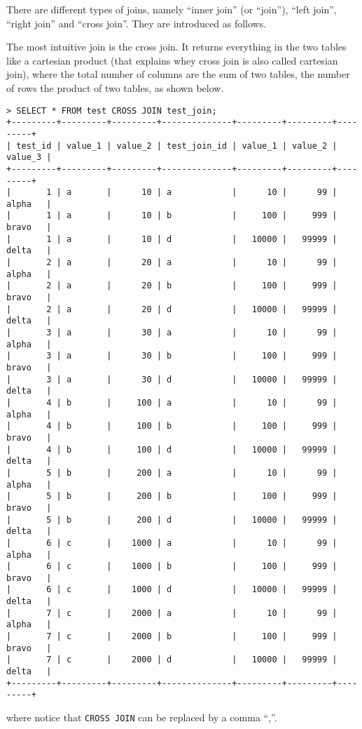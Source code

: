 There are different types of joins, namely ``inner join'' (or ``join''), ``left join'', ``right join'' and ``cross join''. They are introduced as follows.

The most intuitive join is the cross join. It returns everything in the two tables like a cartesian product (that explains whey cross join is also called cartesian join), where the total number of columns are the sum of two tables, the number of rows the product of two tables, as shown below.
\begin{lstlisting}
> SELECT * FROM test CROSS JOIN test_join;
+---------+---------+---------+--------------+---------+---------+---------+
| test_id | value_1 | value_2 | test_join_id | value_1 | value_2 | value_3 |
+---------+---------+---------+--------------+---------+---------+---------+
|       1 | a       |      10 | a            |      10 |      99 | alpha   |
|       1 | a       |      10 | b            |     100 |     999 | bravo   |
|       1 | a       |      10 | d            |   10000 |   99999 | delta   |
|       2 | a       |      20 | a            |      10 |      99 | alpha   |
|       2 | a       |      20 | b            |     100 |     999 | bravo   |
|       2 | a       |      20 | d            |   10000 |   99999 | delta   |
|       3 | a       |      30 | a            |      10 |      99 | alpha   |
|       3 | a       |      30 | b            |     100 |     999 | bravo   |
|       3 | a       |      30 | d            |   10000 |   99999 | delta   |
|       4 | b       |     100 | a            |      10 |      99 | alpha   |
|       4 | b       |     100 | b            |     100 |     999 | bravo   |
|       4 | b       |     100 | d            |   10000 |   99999 | delta   |
|       5 | b       |     200 | a            |      10 |      99 | alpha   |
|       5 | b       |     200 | b            |     100 |     999 | bravo   |
|       5 | b       |     200 | d            |   10000 |   99999 | delta   |
|       6 | c       |    1000 | a            |      10 |      99 | alpha   |
|       6 | c       |    1000 | b            |     100 |     999 | bravo   |
|       6 | c       |    1000 | d            |   10000 |   99999 | delta   |
|       7 | c       |    2000 | a            |      10 |      99 | alpha   |
|       7 | c       |    2000 | b            |     100 |     999 | bravo   |
|       7 | c       |    2000 | d            |   10000 |   99999 | delta   |
+---------+---------+---------+--------------+---------+---------+---------+
\end{lstlisting}
where notice that \verb|CROSS JOIN| can be replaced by a comma ``,''.


